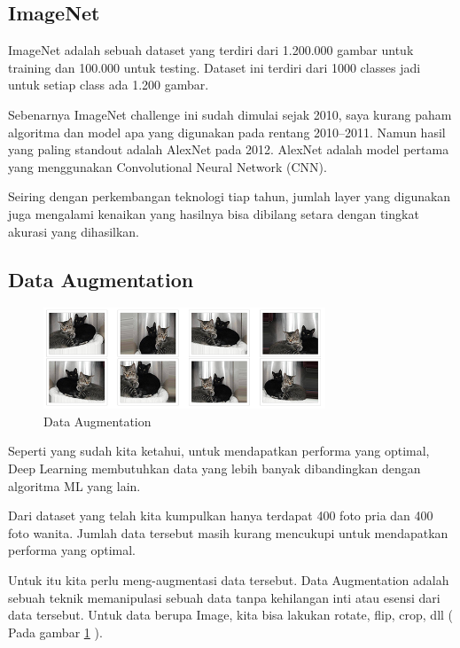 \subsection{ImageNet}
ImageNet adalah sebuah dataset yang terdiri dari 1.200.000 gambar untuk training dan 100.000 untuk testing. Dataset ini terdiri dari 1000 classes jadi untuk setiap class ada 1.200 gambar.

Sebenarnya ImageNet challenge ini sudah dimulai sejak 2010, saya kurang paham algoritma dan model apa yang digunakan pada rentang 2010–2011. Namun hasil yang paling standout adalah AlexNet pada 2012. AlexNet adalah model pertama yang menggunakan Convolutional Neural Network (CNN). 

Seiring dengan perkembangan teknologi tiap tahun, jumlah layer yang digunakan juga mengalami kenaikan yang hasilnya bisa dibilang setara dengan tingkat akurasi yang dihasilkan.

\subsection{Data Augmentation}
\begin{figure}[!htp]
	\includegraphics[width=0.75\textwidth]{figures/Augmentation.PNG}
	\caption{Data Augmentation}
	\label{Augmentation}
\end{figure}

Seperti yang sudah kita ketahui, untuk mendapatkan performa yang optimal, Deep Learning membutuhkan data yang lebih banyak dibandingkan dengan algoritma ML yang lain.

Dari dataset yang telah kita kumpulkan hanya terdapat 400 foto pria dan 400 foto wanita. Jumlah data tersebut masih kurang mencukupi untuk mendapatkan performa yang optimal.

Untuk itu kita perlu meng-augmentasi data tersebut. Data Augmentation adalah sebuah teknik memanipulasi sebuah data tanpa kehilangan inti atau esensi dari data tersebut. Untuk data berupa Image, kita bisa lakukan rotate, flip, crop, dll ( Pada gambar \ref {Augmentation} ).


